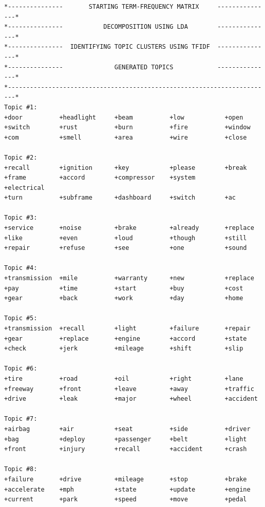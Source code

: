 \documentclass[12pt]{article}
\begin{document}
{\footnotesize
\begin{lstlisting}
*---------------       STARTING TERM-FREQUENCY MATRIX     ---------------*
*---------------           DECOMPOSITION USING LDA        ---------------*
*---------------  IDENTIFYING TOPIC CLUSTERS USING TFIDF  ---------------*
*---------------              GENERATED TOPICS            ---------------*
*------------------------------------------------------------------------*
Topic #1: 
+door          +headlight     +beam          +low           +open          
+switch        +rust          +burn          +fire          +window        
+com           +smell         +area          +wire          +close         

Topic #2: 
+recall        +ignition      +key           +please        +break         
+frame         +accord        +compressor    +system        +electrical    
+turn          +subframe      +dashboard     +switch        +ac            

Topic #3: 
+service       +noise         +brake         +already       +replace       
+like          +even          +loud          +though        +still         
+repair        +refuse        +see           +one           +sound         

Topic #4: 
+transmission  +mile          +warranty      +new           +replace       
+pay           +time          +start         +buy           +cost          
+gear          +back          +work          +day           +home          

Topic #5: 
+transmission  +recall        +light         +failure       +repair        
+gear          +replace       +engine        +accord        +state         
+check         +jerk          +mileage       +shift         +slip          

Topic #6: 
+tire          +road          +oil           +right         +lane          
+freeway       +front         +leave         +away          +traffic       
+drive         +leak          +major         +wheel         +accident      

Topic #7: 
+airbag        +air           +seat          +side          +driver        
+bag           +deploy        +passenger     +belt          +light         
+front         +injury        +recall        +accident      +crash         

Topic #8: 
+failure       +drive         +mileage       +stop          +brake         
+accelerate    +mph           +state         +update        +engine        
+current       +park          +speed         +move          +pedal         
\end{lstlisting}
}
\pagebreak
\end{document}
